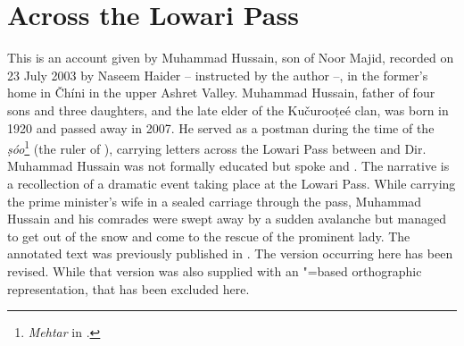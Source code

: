 \appendix
{}

\section*{Across the Lowari Pass}

This is an account given by Muhammad Hussain, son of Noor Majid, recorded on 23 July 2003 by Naseem Haider -- instructed by the author --, in the former’s home in Čhíni in the upper Ashret Valley. Muhammad Hussain, father of four sons and three daughters, and the late elder of the Kučurooṭeé clan, was born in 1920 and passed away in 2007. He served as a postman during the time of the \textit{ṣóo}\footnote{\textit{Mehtar} in \iliKhowar.} (the ruler of \iliChitral), carrying letters across the Lowari Pass between \iliChitral and Dir. Muhammad Hussain was not formally educated but spoke \iliPashto and \iliKhowar. The narrative is a recollection of a dramatic event taking place at the Lowari Pass. While carrying the prime minister’s wife in a sealed carriage through the pass, Muhammad Hussain and his comrades were swept away by a sudden avalanche but managed to get out of the snow and come to the rescue of the prominent lady. The annotated text was previously published in \citet[131--137]{liljegrenhaider2015}. The version occurring here has been revised. While that version was also supplied with an \iliArabic"=based orthographic representation, that has been excluded here.


